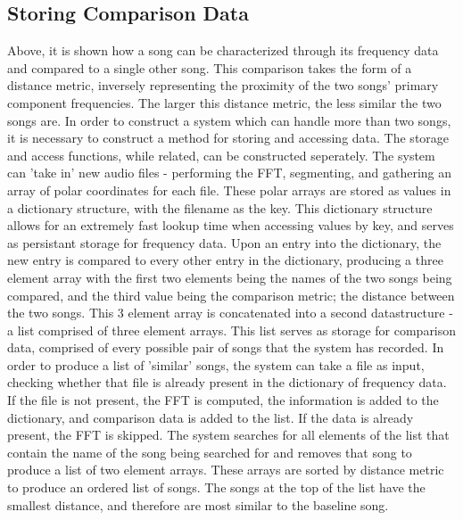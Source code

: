 \documentclass[conference]{IEEEtran}
\begin{document}
\subsection{Storing Comparison Data}
Above, it is shown how a song can be characterized through its frequency data and compared to a single other song. This comparison takes the form of a distance metric, inversely representing the proximity of the two songs' primary component frequencies. The larger this distance metric, the less similar the two songs are. In order to construct a system which can handle more than two songs, it is necessary to construct a method for storing and accessing data. The storage and access functions, while related, can be constructed seperately. The system can 'take in' new audio files - performing the FFT, segmenting, and gathering an array of polar coordinates for each file. These polar arrays are stored as values in a dictionary structure, with the filename as the key. This dictionary structure allows for an extremely fast lookup time when accessing values by key, and serves as persistant storage for frequency data.
Upon an entry into the dictionary, the new entry is compared to every other entry in the dictionary, producing a three element array with the first two elements being the names of the two songs being compared, and the third value being the comparison metric; the distance between the two songs. This 3 element array is concatenated into a second datastructure - a list comprised of three element arrays. This list serves as storage for comparison data, comprised of every possible pair of songs that the system has recorded. In order to produce a list of 'similar' songs, the system can take a file as input, checking whether that file is already present in the dictionary of frequency data. If the file is not present, the FFT is computed, the information is added to the dictionary, and comparison data is added to the list. If the data is already present, the FFT is skipped. The system searches for all elements of the list that contain the name of the song being searched for and removes that song to produce a list of two element arrays. These arrays are sorted by distance metric to produce an ordered list of songs. The songs at the top of the list have the smallest distance, and therefore are most similar to the baseline song.
\end{document}
